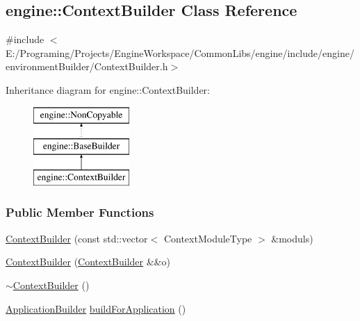 \hypertarget{a00013}{}\subsection{engine\+:\+:Context\+Builder Class Reference}
\label{a00013}


{\ttfamily \#include $<$E\+:/\+Programing/\+Projects/\+Engine\+Workspace/\+Common\+Libs/engine/include/engine/environment\+Builder/\+Context\+Builder.\+h$>$}

Inheritance diagram for engine\+:\+:Context\+Builder\+:\begin{figure}[H]
\begin{center}
\leavevmode
\includegraphics[height=3.000000cm]{a00013}
\end{center}
\end{figure}
\subsubsection*{Public Member Functions}
\begin{DoxyCompactItemize}
\item 
\hyperlink{a00013_aca8c1a2731d9f2da0d0cb3fa150c314c}{Context\+Builder} (const std\+::vector$<$ Context\+Module\+Type $>$ \&moduls)
\item 
\hyperlink{a00013_ae8a046bccdc9e1461de3f952e15df0e4}{Context\+Builder} (\hyperlink{a00013}{Context\+Builder} \&\&o)
\item 
\hyperlink{a00013_acbc8b557d2a1755b41dc4e39cfefaa79}{$\sim$\+Context\+Builder} ()
\item 
\hyperlink{a00003}{Application\+Builder} \hyperlink{a00013_a397a774fc36c66dda2ee90a56f4094e1}{build\+For\+Application} ()
\end{DoxyCompactItemize}
